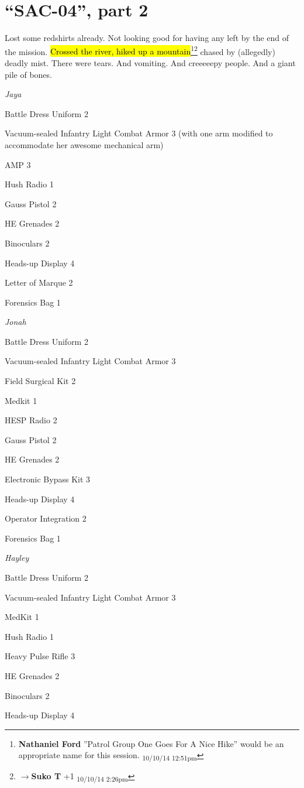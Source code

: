 \setcounter{chapter}{ 33 }
\chapter{\textbf{``SAC-04'', part 2} }





Lost some redshirts already.  Not looking good for having any left by the end of the mission. \hl{Crossed the river, hiked up a mountain}\footnote{\textbf{Nathaniel Ford }''Patrol Group One Goes For A Nice Hike'' would be an appropriate name for this session. \textsubscript{10/10/14 12:51pm}}\footnote{$\rightarrow$\textbf{Suko T }+1 \textsubscript{10/10/14 2:26pm}} chased by (allegedly) deadly mist.  There were tears.  And vomiting.  And creeeeepy people.  And a giant pile of bones. 




\textit{Jaya}

{\parskip=0pt
Battle Dress Uniform 2

Vacuum-sealed Infantry Light Combat Armor 3 (with one arm modified to accommodate her awesome mechanical arm)

AMP 3

Hush Radio 1

Gauss Pistol 2

HE Grenades 2

Binoculars 2

Heads-up Display 4

Letter of Marque 2

Forensics Bag 1
}


\textit{Jonah}

{\parskip=0pt
Battle Dress Uniform 2

Vacuum-sealed Infantry Light Combat Armor 3

Field Surgical Kit 2

Medkit 1

HESP Radio 2

Gauss Pistol 2

HE Grenades 2

Electronic Bypass Kit 3

Heads-up Display 4

Operator Integration 2

Forensics Bag 1
}


\textit{Hayley}

{\parskip=0pt
Battle Dress Uniform 2

Vacuum-sealed Infantry Light Combat Armor 3

MedKit 1

Hush Radio 1

Heavy Pulse Rifle 3

HE Grenades 2

Binoculars 2

Heads-up Display 4
}

